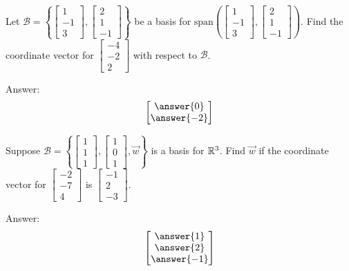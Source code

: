 \documentclass{ximera}
\begin{document}
\begin{problem}\label{prob:coordvect3}
Let $\mathcal{B}=\left\{\begin{bmatrix}1\\-1\\3\end{bmatrix},\begin{bmatrix}2\\1\\-1\end{bmatrix}\right\}$ be a basis for 
$\mbox{span}\left(\begin{bmatrix}1\\-1\\3\end{bmatrix},\begin{bmatrix}2\\1\\-1\end{bmatrix}\right)$.  Find the coordinate vector for $\begin{bmatrix}-4\\-2\\2\end{bmatrix}$ with respect to $\mathcal{B}$.

Answer:
$$\begin{bmatrix}\answer{0}\\\answer{-2}\end{bmatrix}$$
\end{problem}

\begin{problem}\label{prob:coordvect4}
Suppose $\mathcal{B}=\left\{\begin{bmatrix}1\\1\\1\end{bmatrix},\begin{bmatrix}1\\0\\1\end{bmatrix}, \vec{w}\right\}$ is a basis for $\mathbb{R}^3$.  Find $\vec{w}$ if the coordinate vector for $\begin{bmatrix}-2\\-7\\4\end{bmatrix}$ is $\begin{bmatrix}-1\\2\\-3\end{bmatrix}$.

Answer:
$$\begin{bmatrix}\answer{1}\\\answer{2}\\\answer{-1}\end{bmatrix}$$
\end{problem}
\end{document}
